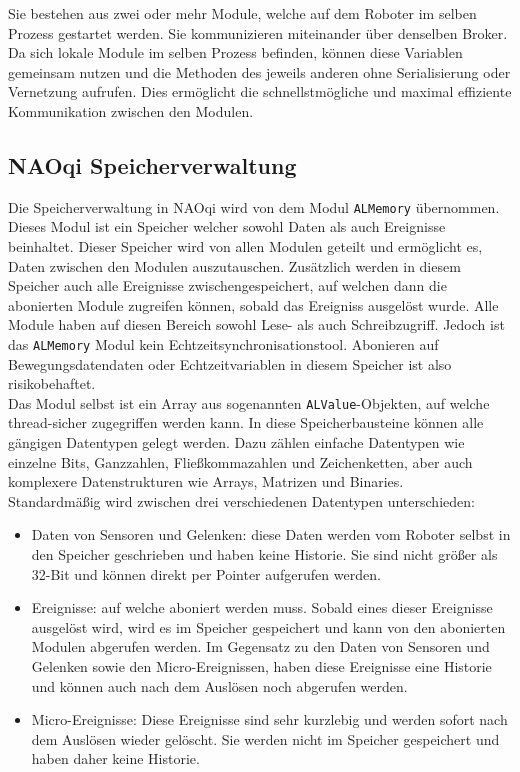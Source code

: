 \noindent
Sie bestehen aus zwei oder mehr Module, welche auf dem Roboter im selben Prozess gestartet werden. Sie kommunizieren miteinander über denselben Broker.\\
Da sich lokale Module im selben Prozess befinden, können diese Variablen gemeinsam nutzen und die Methoden des jeweils anderen ohne Serialisierung oder Vernetzung aufrufen. Dies ermöglicht die schnellstmögliche und maximal effiziente Kommunikation zwischen den Modulen.\\

\subsection{NAOqi Speicherverwaltung}\label{subsec:NAOqiSpeicherverwaltung}
Die Speicherverwaltung in NAOqi wird von dem Modul \texttt{ALMemory} übernommen. Dieses Modul ist ein Speicher welcher sowohl Daten als auch Ereignisse beinhaltet. Dieser Speicher wird von allen Modulen geteilt und ermöglicht es, Daten zwischen den Modulen auszutauschen. Zusätzlich werden in diesem Speicher auch alle Ereignisse zwischengespeichert, auf welchen dann die abonierten Module zugreifen können, sobald das Ereigniss ausgelöst wurde. Alle Module haben auf diesen Bereich sowohl Lese- als auch Schreibzugriff. Jedoch ist das \texttt{ALMemory} Modul kein Echtzeitsynchronisationstool. Abonieren auf Bewegungsdatendaten oder Echtzeitvariablen in diesem Speicher ist also risikobehaftet.
\\

\noindent
Das Modul selbst ist ein Array aus sogenannten \texttt{ALValue}-Objekten, auf welche thread-sicher zugegriffen werden kann. In diese Speicherbausteine können alle gängigen Datentypen gelegt werden. Dazu zählen einfache Datentypen wie einzelne Bits, Ganzzahlen, Fließkommazahlen und Zeichenketten, aber auch komplexere Datenstrukturen wie Arrays, Matrizen und Binaries.
\\

\noindent
Standardmäßig wird zwischen drei verschiedenen Datentypen unterschieden:\\
\begin{itemize}
    \item Daten von Sensoren und Gelenken: diese Daten werden vom Roboter selbst in den Speicher geschrieben und haben keine Historie. Sie sind nicht größer als 32-Bit und können direkt per Pointer aufgerufen werden.
    \item Ereignisse: auf welche aboniert werden muss. Sobald eines dieser Ereignisse ausgelöst wird, wird es im Speicher gespeichert und kann von den abonierten Modulen abgerufen werden. Im Gegensatz zu den Daten von Sensoren und Gelenken sowie den Micro-Ereignissen, haben diese Ereignisse eine Historie und können auch nach dem Auslösen noch abgerufen werden.
    \item Micro-Ereignisse: Diese Ereignisse sind sehr kurzlebig und werden sofort nach dem Auslösen wieder gelöscht. Sie werden nicht im Speicher gespeichert und haben daher keine Historie.
\end{itemize}


